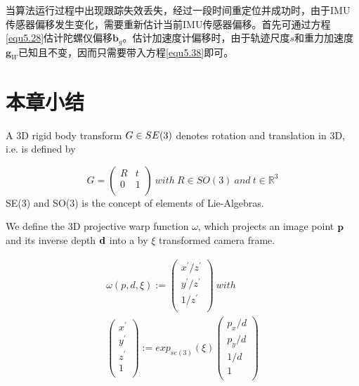 当算法运行过程中出现跟踪失效丢失，经过一段时间重定位并成功时，由于IMU传感器偏移发生变化，需要重新估计当前IMU传感器偏移。首先可通过方程\eqref{equ5.28}估计陀螺仪偏移$\boldsymbol{b}_g$。估计加速度计偏移时，由于轨迹尺度$s$和重力加速度$\boldsymbol{g}_W$已知且不变，因而只需要带入方程\eqref{equ5.38}即可。

\section{本章小结}




\iffalse
A 3D rigid body transform $G{\rm{ }} \in {\rm{ }}SE(3)$  denotes rotation and translation in 3D,  i.e. is defined by

\begin{equation}
G=\left(
    \begin{array}{cc}
      R & t \\
      0 & 1 \\
    \end{array}
  \right)
    \ with
    \ R\in SO(3)
    \ and
    \ t\in {\mathbb{R}}^{3}
\end{equation}
SE(3) and SO(3) is the concept of elements of Lie-Algebras.

We define the 3D projective warp function $\omega $, which projects an image point ${\bf{p}}$ and its inverse depth ${\bf{d}}$ into a by $\xi $ transformed camera frame.

\begin{equation}
\begin{split}
\omega(p,d,\xi):= \left(
                     \begin{array}{c}
                       x^{'}/z^{'} \\
                       y^{'}/z^{'} \\
                       1/z^{'} \\
                     \end{array}
                   \right) \ with \\
                   \left(
                     \begin{array}{c}
                       x^{'} \\
                       y^{'} \\
                       z^{'} \\
                       1 \\
                     \end{array}
                   \right):=\!exp_{\!se(\!3\!)}(\xi)
                   \left(
                     \begin{array}{c}
                       p_{x}/d \\
                       p_{y}/d  \\
                       1/d  \\
                       1 \\
                     \end{array}
                   \right)
\end{split}
\end{equation}

